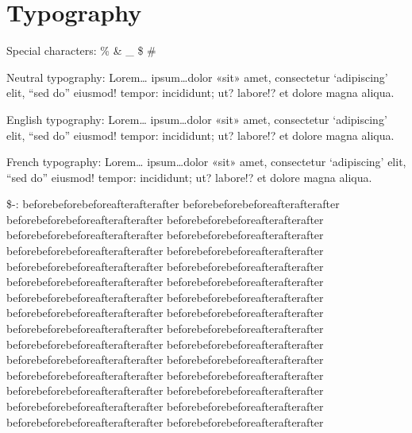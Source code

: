\documentclass[demo]{pyscribe}
\begin{document}
\makeatletter
\begin{center}
{\LARGE \@maintitle \par}
\end{center}
\makeatother

\newpage

\renewcommand\contentsname{Sommaire}
\tableofcontents



\chapter{Typography}

Special characters: \% \& \_ \$ \#

Neutral typography: Lorem\dots{} ipsum\dots{}dolor «sit» amet, consectetur `adipiscing' elit, “sed do” eiusmod! tempor: incididunt; ut? labore!? et dolore magna aliqua. \par
English typography: Lorem\dots{} ipsum\dots{}dolor «sit» amet, consectetur `adipiscing' elit, “sed do” eiusmod! tempor: incididunt; ut? labore!? et dolore magna aliqua. \par
French typography: Lorem\dots{} ipsum\dots{}dolor «sit» amet, consectetur `adipiscing' elit, “sed do” eiusmod! tempor: incididunt; ut? labore!? et dolore magna aliqua. \par

\par\$-: beforebeforebefore\-afterafterafter beforebeforebefore\-afterafterafter beforebeforebefore\-afterafterafter beforebeforebefore\-afterafterafter beforebeforebefore\-afterafterafter beforebeforebefore\-afterafterafter beforebeforebefore\-afterafterafter beforebeforebefore\-afterafterafter beforebeforebefore\-afterafterafter beforebeforebefore\-afterafterafter 
beforebeforebefore\-afterafterafter beforebeforebefore\-afterafterafter beforebeforebefore\-afterafterafter beforebeforebefore\-afterafterafter beforebeforebefore\-afterafterafter beforebeforebefore\-afterafterafter beforebeforebefore\-afterafterafter beforebeforebefore\-afterafterafter beforebeforebefore\-afterafterafter beforebeforebefore\-afterafterafter 
beforebeforebefore\-afterafterafter beforebeforebefore\-afterafterafter beforebeforebefore\-afterafterafter beforebeforebefore\-afterafterafter beforebeforebefore\-afterafterafter beforebeforebefore\-afterafterafter beforebeforebefore\-afterafterafter beforebeforebefore\-afterafterafter beforebeforebefore\-afterafterafter beforebeforebefore\-afterafterafter 
\end{document}
